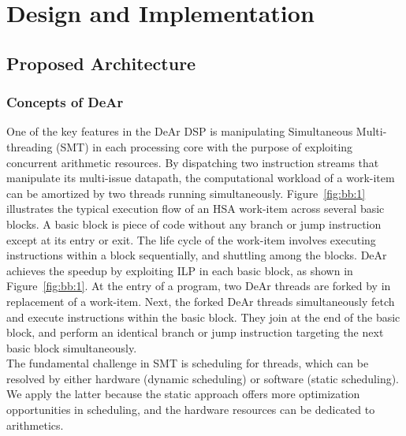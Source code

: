 \chapter{Design and Implementation}
\section{Proposed Architecture}
\subsection{Concepts of DeAr}
\indent 
One of the key features in the DeAr DSP is manipulating Simultaneous Multi-threading (SMT) in each processing core with the purpose of exploiting concurrent arithmetic resources.
By dispatching two instruction streams that manipulate its multi-issue datapath, 
the computational workload of a work-item can be amortized by two threads running simultaneously.
Figure~\ref{fig:bb:1} illustrates the typical execution flow of an HSA work-item across several basic blocks.
A basic block is piece of code without any branch or jump instruction except at its entry or exit.
The life cycle of the work-item involves executing instructions within a block sequentially, and shuttling among the blocks.
DeAr achieves the speedup by exploiting ILP in each basic block, as shown in Figure~\ref{fig:bb:1}. 
At the entry of a program, two DeAr threads are forked by in replacement of a work-item.
Next, the forked DeAr threads simultaneously fetch and execute instructions within the basic block.
They join at the end of the basic block, and perform an identical branch or jump instruction targeting the next basic block simultaneously.
\\\indent
The fundamental challenge in SMT is scheduling for threads, 
which can be resolved by either hardware (dynamic scheduling) or software (static scheduling).
We apply the latter because the static approach offers more optimization opportunities in scheduling, 
and the hardware resources can be dedicated to arithmetics.
\vspace{\textfig}
